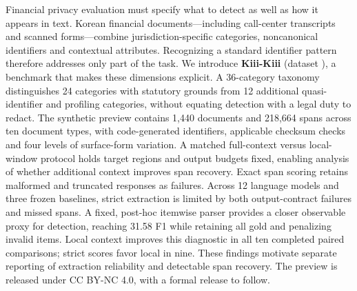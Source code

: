 Financial privacy evaluation must specify what to detect as well as how it appears in text. Korean financial documents---including call-center transcripts and scanned forms---combine jurisdiction-specific categories, noncanonical identifiers and contextual attributes. Recognizing a standard identifier pattern therefore addresses only part of the task. We introduce \textbf{Kiii-Kiii} (dataset \kiii{}), a benchmark that makes these dimensions explicit. A 36-category taxonomy distinguishes 24 categories with statutory grounds from 12 additional quasi-identifier and profiling categories, without equating detection with a legal duty to redact. The synthetic preview contains 1,440 documents and 218,664 spans across ten document types, with code-generated identifiers, applicable checksum checks and four levels of surface-form variation. A matched full-context versus local-window protocol holds target regions and output budgets fixed, enabling analysis of whether additional context improves span recovery. Exact span scoring retains malformed and truncated responses as failures. Across 12 language models and three frozen baselines, strict extraction is limited by both output-contract failures and missed spans. A fixed, post-hoc itemwise parser provides a closer observable proxy for detection, reaching 31.58 F1 while retaining all gold and penalizing invalid items. Local context improves this diagnostic in all ten completed paired comparisons; strict scores favor local in nine. These findings motivate separate reporting of extraction reliability and detectable span recovery. The preview is released under CC BY-NC 4.0, with a formal release to follow.
